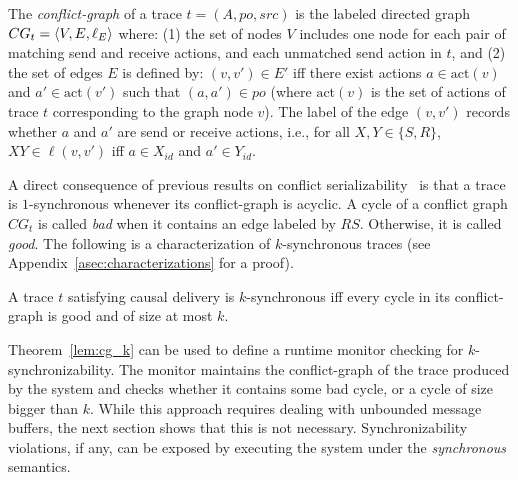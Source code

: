 
    The \emph{conflict-graph} of a trace $t=(A,po,src)$ is the labeled directed graph $CG_t=\left\langle {V,E,\ell_E} \right\rangle$ where:
(1) the set of nodes $V$ includes one node for each pair of matching send and receive actions, and each unmatched send action in $t$, and 
(2) the set of edges $E$ is defined by: $(v,v') \in E'$ iff there exist actions $a \in \mathrm{act}(v)$ and $a' \in \mathrm{act}(v')$ such that $(a,a') \in po$ (where $\mathrm{act}(v)$ is the set of actions of trace $t$ corresponding to the graph node $v$). The label of the edge $(v,v')$ records whether $a$ and $a'$ are send or receive actions, i.e., for all $X,Y\in \{S,R\}$, $XY\in \ell(v,v')$ iff $a\in X_{id}$ and $a'\in Y_{id}$.

A direct consequence of previous results on conflict serializability~\cite{journals/jacm/Papadimitriou79b} is that 
a trace is $1$-synchronous whenever its conflict-graph is acyclic.
%
%
A cycle of a conflict graph $CG_t$ is called \emph{bad} when it contains %
an edge labeled by $RS$.
Otherwise, it is called \emph{good}.
The following is a characterization of $k$-synchronous traces (see Appendix~\ref{asec:characterizations} for a proof).


\begin{theorem}\label{lem:cg_k}
A trace $t$ satisfying causal delivery is $k$-synchronous if{f} every cycle in its conflict-graph is good and of size at most $k$.
\end{theorem}

Theorem~\ref{lem:cg_k} can be used to define a runtime monitor checking for $k$-synchronizability. 
The monitor maintains the conflict-graph of the trace produced by the system and checks whether it contains some bad cycle, or a cycle of size bigger than $k$.
While this approach requires dealing with unbounded message buffers, the next section shows that this is not necessary. Synchronizability violations, if any, can be exposed by executing the system under the \emph{synchronous} semantics.




